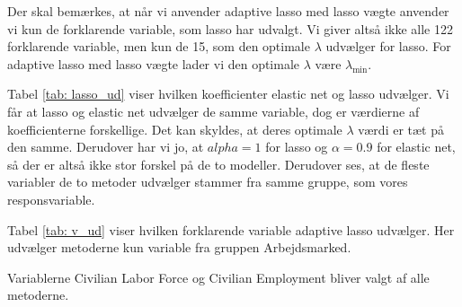 Der skal bemærkes, at når vi anvender adaptive lasso med lasso vægte anvender vi kun de forklarende variable, som lasso har udvalgt. 
Vi giver altså ikke alle 122 forklarende variable, men kun de 15, som den optimale $\lambda$ udvælger for lasso.
For adaptive lasso med lasso vægte lader vi den optimale $\lambda$ være $\lambda_{\min}$.  

Tabel \ref{tab: lasso_ud} viser hvilken koefficienter elastic net og lasso udvælger. 
Vi får at lasso og elastic net udvælger de samme variable, dog er værdierne af koefficienterne forskellige. 
Det kan skyldes, at deres optimale $\lambda$ værdi er tæt på den samme. 
Derudover har vi jo,  at $alpha = 1$ for lasso og $\alpha = 0.9$ for elastic net, så der er altså ikke stor forskel på de to modeller. 
Derudover ses, at de fleste variabler de to metoder udvælger stammer fra samme gruppe, som vores responsvariable.  

Tabel \ref{tab: v_ud} viser hvilken forklarende variable adaptive lasso udvælger.  Her udvælger metoderne kun variable fra gruppen Arbejdsmarked. 

Variablerne Civilian Labor Force og Civilian Employment bliver valgt af alle metoderne. 



